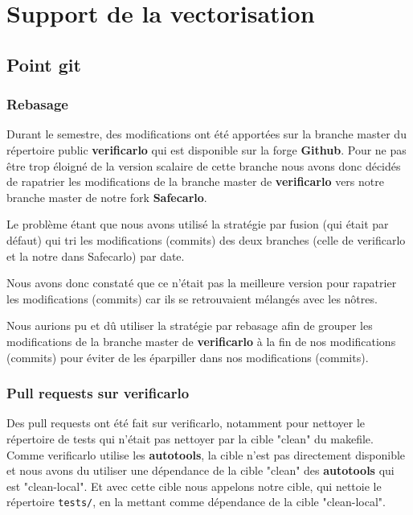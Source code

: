 \documentclass[12pt, letterpaper]{article}
\begin{document}
\section{Support de la vectorisation}
\label{sec:org17ade77}
\subsection{Point git}
\label{sec:org2d74792}
\subsubsection{Rebasage}
\label{sec:org4015044}

Durant le semestre, des modifications ont été apportées sur la branche master
du répertoire public \textbf{verificarlo} qui est disponible sur la forge
\textbf{Github}. Pour ne pas être trop éloigné de la version scalaire de
cette branche nous avons donc décidés de rapatrier les modifications de la
branche master de \textbf{verificarlo} vers notre branche master de notre fork
\textbf{Safecarlo}.

Le problème étant que nous avons utilisé la stratégie par fusion (qui était
par défaut) qui tri les modifications (commits) des deux branches (celle
de verificarlo et la notre dans Safecarlo) par date.

Nous avons donc constaté que ce n'était pas la meilleure version pour
rapatrier les modifications (commits) car ils se retrouvaient mélangés avec
les nôtres.

Nous aurions pu et dû utiliser la stratégie par rebasage afin de grouper les
modifications de la branche master de \textbf{verificarlo} à la fin de nos
modifications (commits) pour éviter de les éparpiller dans nos modifications
(commits).

\subsubsection{Pull requests sur verificarlo}
\label{sec:orgd011a63}

Des pull requests ont été fait sur verificarlo, notamment pour nettoyer le
répertoire de tests qui n'était pas nettoyer par la cible "clean" du
makefile. Comme verificarlo utilise les \textbf{autotools}, la cible n'est pas
directement disponible et nous avons du utiliser une dépendance de la cible
"clean" des \textbf{autotools} qui est "clean-local". Et avec cette cible nous
appelons notre cible, qui nettoie le répertoire \texttt{tests/}, en la mettant
comme dépendance de la cible "clean-local".
\end{document}
